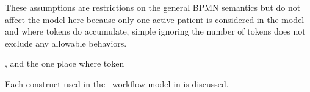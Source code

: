 These assumptions are restrictions on the general BPMN semantics but do not affect the model here because only one active patient is considered in the model and where tokens do accumulate, simple ignoring the number of tokens does not exclude any allowable behaviors. 

, and the one place where token 

Each construct used in the \phware\ workflow model in  is discussed.